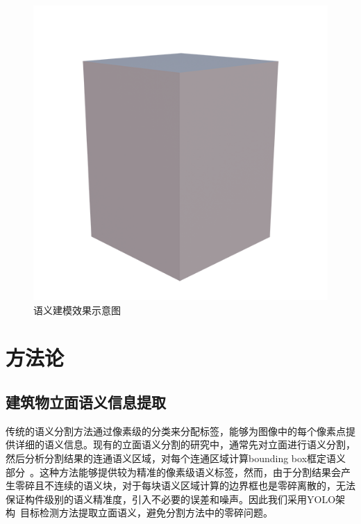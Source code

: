 \documentclass[10pt,twocolumn,letterpaper]{article}
\begin{document}
\begin{figure}[htbp]
\begin{minipage}[b]{0.19\textwidth}
  \end{minipage}
  \hfill
  \begin{minipage}[b]{0.19\textwidth}
      \centering
      \includegraphics[width=\textwidth]{images/Bld1.png} %
  \end{minipage}
  \caption{语义建模效果示意图}
  \label{fig:row2}
\end{figure}
\section{方法论}
\subsection{建筑物立面语义信息提取}

传统的语义分割方法通过像素级的分类来分配标签，能够为图像中的每个像素点提供详细的语义信息。现有的立面语义分割的研究中，通常先对立面进行语义分割，然后分析分割结果的连通语义区域，对每个连通区域计算bounding box框定语义部分~\cite{wang2024framework,mathias2016atlas,ma2022progressive}。这种方法能够提供较为精准的像素级语义标签，然而，由于分割结果会产生零碎且不连续的语义块，对于每块语义区域计算的边界框也是零碎离散的，无法保证构件级别的语义精准度，引入不必要的误差和噪声。因此我们采用YOLO架构~\cite{wang2025yolov10}目标检测方法提取立面语义，避免分割方法中的零碎问题。
\end{document}

